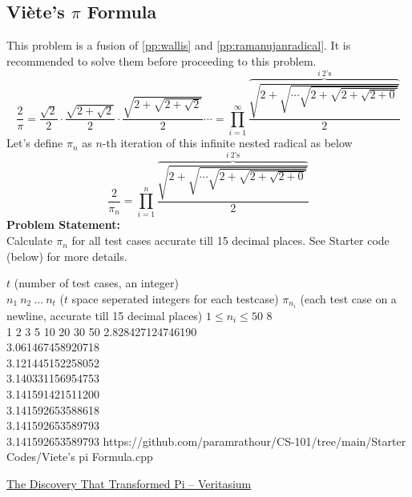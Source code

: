 \documentclass[../../Problems]{subfiles}
\begin{document}
\subsection{Viète's $\pi$ Formula}{\label{pp:vietesformula}}
This problem is a fusion of \ref{pp:wallis} and \ref{pp:ramanujanradical}. It is recommended to solve them before proceeding to this problem.
\begin{equation}
{ {\frac {2}{\pi }}={\frac {\sqrt {2}}{2}}\cdot {\frac {\sqrt {2+{\sqrt {2}}}}{2}}\cdot {\frac {\sqrt {2+{\sqrt {2+{\sqrt {2}}}}}}{2}}\cdots = \prod_{i = 1}^{\infty} \frac{\overbrace{\sqrt{2+\sqrt{\cdots{\sqrt{2+{\sqrt{2+\sqrt{2+0}}}}}}}}^{i\ 2\text{'s}}}{2}}
	\end{equation}
Let's define $\pi_n$ as $n$-th iteration of this infinite nested radical as below
\begin{equation*}
\frac{2}{\pi_n} = \prod_{i = 1}^{n} \frac{\overbrace{\sqrt{2+\sqrt{\cdots{\sqrt{2+{\sqrt{2+\sqrt{2+0}}}}}}}}^{i\ 2\text{'s}}}{2}
\end{equation*}
\textbf{Problem Statement:}\\
Calculate $\pi_n$ for all test cases accurate till 15 decimal places. See Starter code (below) for more details.
\begin{testcases}
	{$t$ \hfill(number of test cases, an integer)\\$n_1\ n_2\ \ldots\ n_t$ \hfill($t$ space seperated integers for each testcase)}
	{$\pi_{n_i}$ \hfill(each test case on a newline, accurate till 15 decimal places)}
	{$1 \leq n_i \leq 50$}
	{8\\1 2 3 5 10 20 30 50}
	{2.828427124746190\\3.061467458920718\\3.121445152258052\\3.140331156954753\\3.141591421511200\\3.141592653588618\\3.141592653589793\\3.141592653589793}
	{https://github.com/paramrathour/CS-101/tree/main/Starter Codes/Viete's pi Formula.cpp}
\end{testcases}
\begin{funvideo}
\href{https://youtu.be/gMlf1ELvRzc}{The Discovery That Transformed Pi -- Veritasium}
\end{funvideo}
\end{document}
